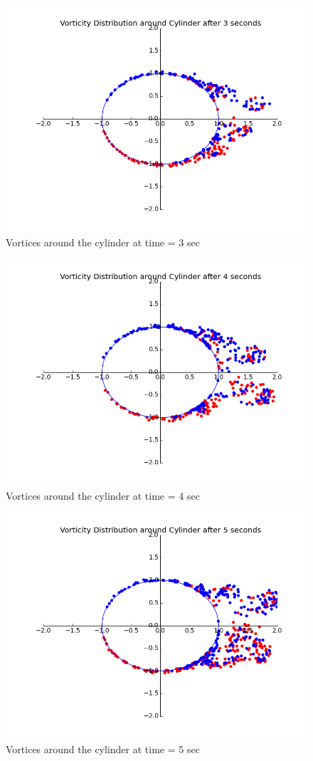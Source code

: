 \documentclass{article}
\begin{document}
\begin{figure}[H]   \label{figure}
\includegraphics[width=12cm]{three.png}
\caption{Vortices around the cylinder at time = 3 sec}
\label{figure:}
\end{figure}

\begin{figure}[H]   \label{figure}
\includegraphics[width=12cm]{four.png}
\caption{Vortices around the cylinder at time = 4 sec}
\label{figure:}
\end{figure}

\begin{figure}[H]   \label{figure}
\includegraphics[width=12cm]{five.png}
\caption{Vortices around the cylinder at time = 5 sec}
\label{figure:}
\end{figure}
\end{document}
